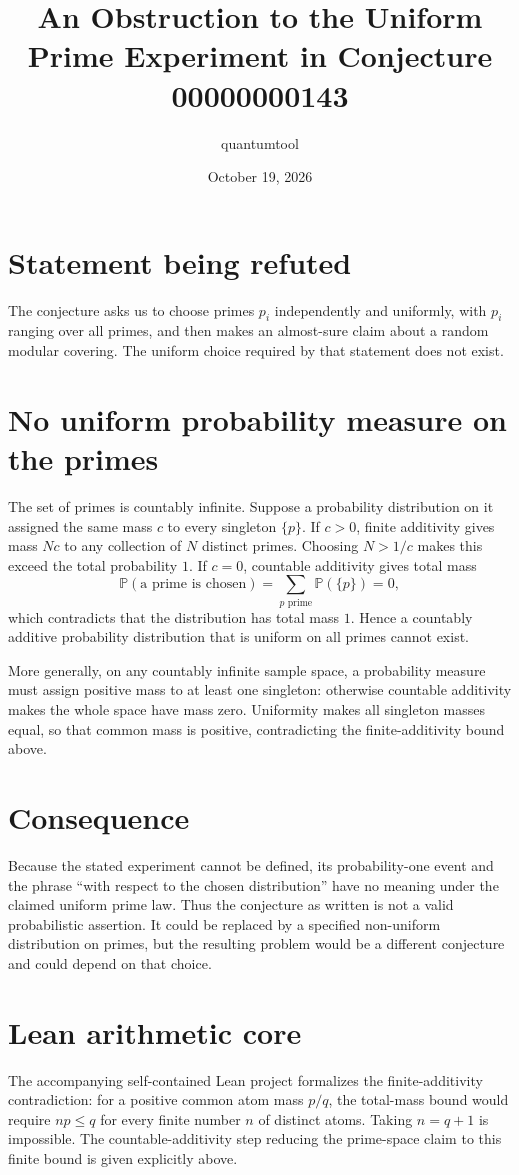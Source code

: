 \documentclass[11pt]{article}
\title{An Obstruction to the Uniform Prime Experiment in Conjecture 00000000143}
\author{quantumtool}
\date{October 19, 2026}
\begin{document}
\maketitle

\section*{Statement being refuted}
The conjecture asks us to choose primes $p_i$ independently and uniformly, with $p_i$ ranging over all primes, and then makes an almost-sure claim about a random modular covering. The uniform choice required by that statement does not exist.

\section*{No uniform probability measure on the primes}
The set of primes is countably infinite. Suppose a probability distribution on it assigned the same mass $c$ to every singleton $\{p\}$. If $c>0$, finite additivity gives mass $Nc$ to any collection of $N$ distinct primes. Choosing $N>1/c$ makes this exceed the total probability $1$. If $c=0$, countable additivity gives total mass
\[
  \mathbb P(\text{a prime is chosen})=\sum_{p\text{ prime}}\mathbb P(\{p\})=0,
\]
which contradicts that the distribution has total mass $1$. Hence a countably additive probability distribution that is uniform on all primes cannot exist.

More generally, on any countably infinite sample space, a probability measure must assign positive mass to at least one singleton: otherwise countable additivity makes the whole space have mass zero. Uniformity makes all singleton masses equal, so that common mass is positive, contradicting the finite-additivity bound above.

\section*{Consequence}
Because the stated experiment cannot be defined, its probability-one event and the phrase “with respect to the chosen distribution” have no meaning under the claimed uniform prime law. Thus the conjecture as written is not a valid probabilistic assertion. It could be replaced by a specified non-uniform distribution on primes, but the resulting problem would be a different conjecture and could depend on that choice.

\section*{Lean arithmetic core}
The accompanying self-contained Lean project formalizes the finite-additivity contradiction: for a positive common atom mass $p/q$, the total-mass bound would require $n p\le q$ for every finite number $n$ of distinct atoms. Taking $n=q+1$ is impossible. The countable-additivity step reducing the prime-space claim to this finite bound is given explicitly above.
\end{document}
